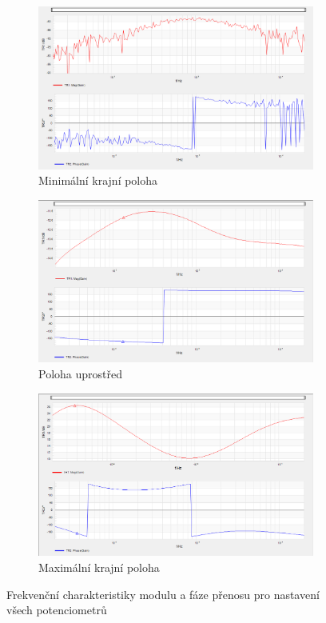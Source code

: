 \documentclass[a4paper, czech]{article}
\begin{document}
\begin{figure}[H]
    \centering
    \begin{subfigure}{0.49\textwidth}
        \includegraphics[width=\textwidth]{nkzt9_2_min_min_min.png}
        \caption{Minimální krajní poloha}
    \end{subfigure}
    \hfill
    \begin{subfigure}{0.49\textwidth}
        \includegraphics[width=\textwidth]{nkzt9_2_mid_mid_mid.png}
        \caption{Poloha uprostřed}
    \end{subfigure}

    \begin{subfigure}{0.49\textwidth}
        \includegraphics[width=\textwidth]{nkzt9_2_max_max_max.png}
        \caption{Maximální krajní poloha}
    \end{subfigure}
    \caption{Frekvenční charakteristiky modulu a fáze přenosu pro nastavení všech potenciometrů} 
\end{figure}
\end{document}
